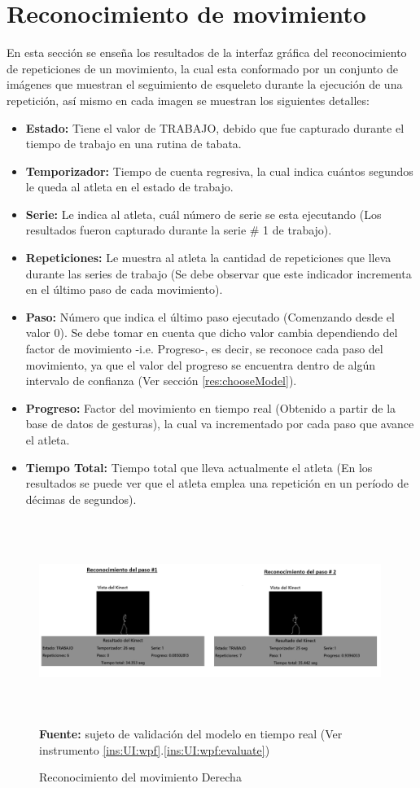 \section{Reconocimiento de movimiento}
En esta secci\'on se ense\~na los resultados de la interfaz gr\'afica del reconocimiento de repeticiones de un movimiento, la cual esta conformado por un conjunto de im\'agenes que muestran el seguimiento de esqueleto durante la ejecuci\'on de una repetici\'on, as\'i mismo en cada imagen se muestran los siguientes detalles:
\begin{itemize}
\item \textbf{Estado:} Tiene el valor de TRABAJO, debido que fue capturado durante el tiempo de trabajo en una rutina de tabata.
\item \textbf{Temporizador:} Tiempo de cuenta regresiva, la cual indica cu\'antos segundos le queda al atleta en el estado de trabajo.
\item \textbf{Serie:} Le indica al atleta, cu\'al n\'umero de serie se esta ejecutando (Los resultados fueron capturado durante la serie \# 1 de trabajo).
\item \textbf{Repeticiones:} Le muestra al atleta la cantidad de repeticiones que lleva durante las  series de trabajo (Se debe observar que este indicador incrementa en el \'ultimo paso de cada movimiento).
\item \textbf{Paso:} N\'umero que indica el \'ultimo paso ejecutado (Comenzando desde el valor 0). Se debe tomar en cuenta que dicho valor cambia dependiendo del factor de movimiento -i.e. Progreso-, es decir, se  reconoce cada paso del movimiento, ya que el valor del progreso se encuentra dentro de alg\'un intervalo de confianza (Ver secci\'on \ref{res:chooseModel}).
\item \textbf{Progreso:} Factor del movimiento en tiempo real (Obtenido a partir de la base de datos de gesturas), la cual va incrementado por cada paso que avance el atleta.
\item \textbf{Tiempo Total:} Tiempo total que lleva actualmente el atleta (En los resultados se puede ver que el atleta emplea una repetici\'on en un per\'iodo de d\'ecimas de segundos).
\end{itemize}
\begin{figure}[H]
	\caption{Reconocimiento del movimiento Derecha}
	\label{fig:recognitionTenis}
	\centering
	\includegraphics[width=420px,height=250px]{graphics/resultados/recognitionTennis.png} \\
	\textbf{Fuente:} sujeto de validaci\'on del modelo en tiempo real (Ver instrumento \ref{ins:UI:wpf}.\ref{ins:UI:wpf:evaluate})
\end{figure}
